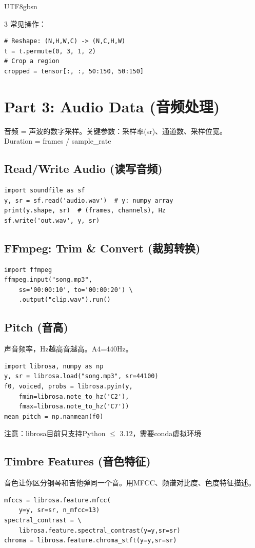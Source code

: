 \documentclass[9pt,landscape,a4paper]{article}
\newcommand{\zhint}[1]{{\scriptsize\color{gray!70!black}#1}}
\begin{document}
\begin{CJK}{UTF8}{gbsn}
\begin{multicols}{3}
\zhint{常见操作：}
\begin{lstlisting}
# Reshape: (N,H,W,C) -> (N,C,H,W)
t = t.permute(0, 3, 1, 2)
# Crop a region
cropped = tensor[:, :, 50:150, 50:150]
\end{lstlisting}

\section{Part 3: Audio Data \zhint{(音频处理)}}

\zhint{音频 = 声波的数字采样。关键参数：采样率(sr)、通道数、采样位宽。}\\
\zhint{Duration = frames / sample\_rate}

\subsection{Read/Write Audio \zhint{(读写音频)}}
\begin{lstlisting}
import soundfile as sf
y, sr = sf.read('audio.wav')  # y: numpy array
print(y.shape, sr)  # (frames, channels), Hz
sf.write('out.wav', y, sr)
\end{lstlisting}

\subsection{FFmpeg: Trim \& Convert \zhint{(裁剪转换)}}
\begin{lstlisting}
import ffmpeg
ffmpeg.input("song.mp3",
    ss='00:00:10', to='00:00:20') \
    .output("clip.wav").run()
\end{lstlisting}

\subsection{Pitch \zhint{(音高)}}
\zhint{声音频率，Hz越高音越高。A4=440Hz。}
\begin{lstlisting}
import librosa, numpy as np
y, sr = librosa.load("song.mp3", sr=44100)
f0, voiced, probs = librosa.pyin(y,
    fmin=librosa.note_to_hz('C2'),
    fmax=librosa.note_to_hz('C7'))
mean_pitch = np.nanmean(f0)
\end{lstlisting}
\zhint{注意：librosa目前只支持Python $\leq$ 3.12，需要conda虚拟环境}

\subsection{Timbre Features \zhint{(音色特征)}}
\zhint{音色让你区分钢琴和吉他弹同一个音。用MFCC、频谱对比度、色度特征描述。}
\begin{lstlisting}
mfccs = librosa.feature.mfcc(
    y=y, sr=sr, n_mfcc=13)
spectral_contrast = \
    librosa.feature.spectral_contrast(y=y,sr=sr)
chroma = librosa.feature.chroma_stft(y=y,sr=sr)
\end{lstlisting}


\end{multicols}
\end{CJK}
\end{document}
